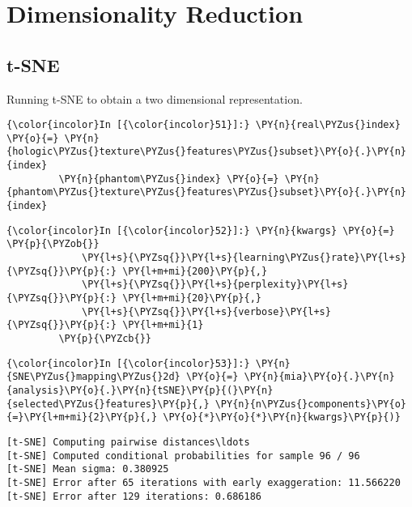     \section{Dimensionality Reduction}\label{dimensionality-reduction}

\subsection{t-SNE}\label{t-sne}

Running t-SNE to obtain a two dimensional representation.

    \begin{Verbatim}[commandchars=\\\{\}]
{\color{incolor}In [{\color{incolor}51}]:} \PY{n}{real\PYZus{}index} \PY{o}{=} \PY{n}{hologic\PYZus{}texture\PYZus{}features\PYZus{}subset}\PY{o}{.}\PY{n}{index}
         \PY{n}{phantom\PYZus{}index} \PY{o}{=} \PY{n}{phantom\PYZus{}texture\PYZus{}features\PYZus{}subset}\PY{o}{.}\PY{n}{index}
\end{Verbatim}

    \begin{Verbatim}[commandchars=\\\{\}]
{\color{incolor}In [{\color{incolor}52}]:} \PY{n}{kwargs} \PY{o}{=} \PY{p}{\PYZob{}}
             \PY{l+s}{\PYZsq{}}\PY{l+s}{learning\PYZus{}rate}\PY{l+s}{\PYZsq{}}\PY{p}{:} \PY{l+m+mi}{200}\PY{p}{,}
             \PY{l+s}{\PYZsq{}}\PY{l+s}{perplexity}\PY{l+s}{\PYZsq{}}\PY{p}{:} \PY{l+m+mi}{20}\PY{p}{,}
             \PY{l+s}{\PYZsq{}}\PY{l+s}{verbose}\PY{l+s}{\PYZsq{}}\PY{p}{:} \PY{l+m+mi}{1}
         \PY{p}{\PYZcb{}}
\end{Verbatim}

    \begin{Verbatim}[commandchars=\\\{\}]
{\color{incolor}In [{\color{incolor}53}]:} \PY{n}{SNE\PYZus{}mapping\PYZus{}2d} \PY{o}{=} \PY{n}{mia}\PY{o}{.}\PY{n}{analysis}\PY{o}{.}\PY{n}{tSNE}\PY{p}{(}\PY{n}{selected\PYZus{}features}\PY{p}{,} \PY{n}{n\PYZus{}components}\PY{o}{=}\PY{l+m+mi}{2}\PY{p}{,} \PY{o}{*}\PY{o}{*}\PY{n}{kwargs}\PY{p}{)}
\end{Verbatim}

    \begin{Verbatim}[commandchars=\\\{\}]
[t-SNE] Computing pairwise distances\ldots
[t-SNE] Computed conditional probabilities for sample 96 / 96
[t-SNE] Mean sigma: 0.380925
[t-SNE] Error after 65 iterations with early exaggeration: 11.566220
[t-SNE] Error after 129 iterations: 0.686186
    \end{Verbatim}

